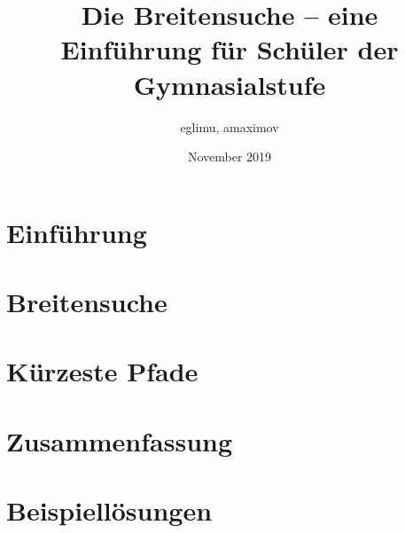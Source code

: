 \documentclass{article}
\title{Die Breitensuche -- eine Einführung für Schüler der Gymnasialstufe}
\author{eglimu, amaximov}
\date{November 2019}
\begin{document}
\maketitle

\tableofcontents

\section{Einführung}


\section{Breitensuche}

\newpage

\section{Kürzeste Pfade}\label{kuerzeste_pfade}

\newpage

\section{Zusammenfassung}

\newpage

\nocite{*}


\newpage

\section{Beispiellösungen}

\end{document}
